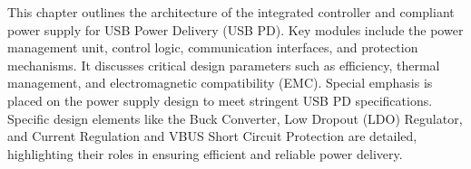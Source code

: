 This chapter outlines the architecture of the integrated controller and compliant power supply for USB Power Delivery (USB PD). Key modules include the power management unit, control logic, communication interfaces, and protection mechanisms. It discusses critical design parameters such as efficiency, thermal management, and electromagnetic compatibility (EMC). Special emphasis is placed on the power supply design to meet stringent USB PD specifications. Specific design elements like the Buck Converter, Low Dropout (LDO) Regulator, and Current Regulation and VBUS Short Circuit Protection are detailed, highlighting their roles in ensuring efficient and reliable power delivery.
